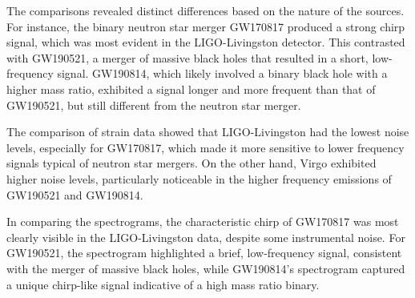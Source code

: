 

The comparisons revealed distinct differences based on the nature of the sources. For instance, the binary neutron star merger GW170817 produced a strong chirp signal, which was most evident in the LIGO-Livingston detector. This contrasted with GW190521, a merger of massive black holes that resulted in a short, low-frequency signal. GW190814, which likely involved a binary black hole with a higher mass ratio, exhibited a signal longer and more frequent than that of GW190521, but still different from the neutron star merger.

The comparison of strain data showed that LIGO-Livingston had the lowest noise levels, especially for GW170817, which made it more sensitive to lower frequency signals typical of neutron star mergers. On the other hand, Virgo exhibited higher noise levels, particularly noticeable in the higher frequency emissions of GW190521 and GW190814.

In comparing the spectrograms, the characteristic chirp of GW170817 was most clearly visible in the LIGO-Livingston data, despite some instrumental noise. For GW190521, the spectrogram highlighted a brief, low-frequency signal, consistent with the merger of massive black holes, while GW190814’s spectrogram captured a unique chirp-like signal indicative of a high mass ratio binary.

